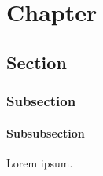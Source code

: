 \chapter{Chapter}

\section{Section}

\subsection{Subsection}

\subsubsection{Subsubsection}

Lorem ipsum.